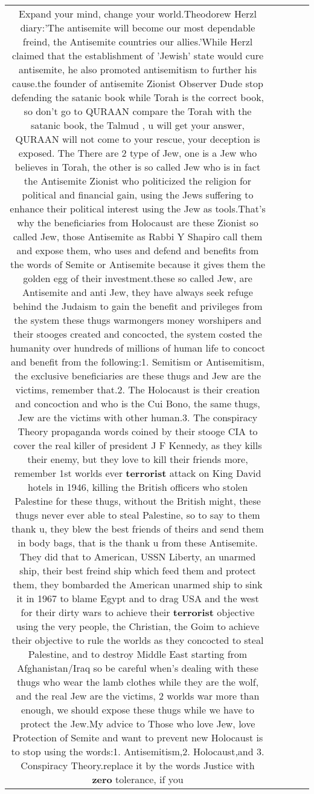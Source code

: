 \documentclass[11pt]{article}
\newlength\mylength
\begin{document}
\begin{center}
\begin{longtable}{|C{.65\mylength}|C{.30\mylength}|C{.12\mylength}|C{.12\mylength}|C{.12\mylength}|}
  \small Expand your mind, change your world.Theodorew Herzl diary:'The antisemite will become our most dependable freind, the Antisemite countries our allies.'While Herzl claimed that the establishment of 'Jewish' state would cure antisemite, he also promoted antisemitism to further his cause.the founder of antisemite Zionist Observer Dude stop defending the satanic book while Torah is the correct book, so don't go to QURAAN compare the Torah with the satanic book, the Talmud , u will get your answer, QURAAN will not come to your rescue, your deception is exposed. The There are 2 type of Jew, one is a Jew who believes in Torah, the other is so called Jew who is in fact the Antisemite Zionist who politicized the religion for political and financial gain, using the Jews suffering to enhance their political interest using the Jew as tools.That's  why the beneficiaries from Holocaust are these Zionist so called Jew, those Antisemite as Rabbi Y Shapiro call them and expose them, who uses and defend and benefits from the words of Semite or Antisemite because it gives them the golden egg of their investment.these  so called Jew, are Antisemite and anti Jew, they have always seek refuge behind the Judaism to gain the benefit and privileges from the system these thugs warmongers money worshipers and their stooges created and concocted, the system costed the humanity over hundreds of millions of human  life to concoct and benefit from the following:1. Semitism or Antisemitism, the exclusive beneficiaries are these thugs and Jew are the victims, remember that.2. The Holocaust is their creation  and concoction and who is the Cui Bono, the same thugs, Jew are the victims with other human.3. The conspiracy Theory propaganda words coined by their stooge CIA to cover the real killer of president J F Kennedy, as they kills their enemy, but they love to kill their friends more, remember 1st worlds ever \textbf{terrorist} attack on King David hotels in 1946, killing the British officers who stolen Palestine for these thugs, without the British might, these thugs never ever able to steal Palestine, so to say to them thank u, they blew the best friends of theirs and send them in body bags, that is the thank u from these Antisemite. They did that to American, USSN Liberty, an unarmed ship,  their best freind ship which feed them and protect them, they bombarded the American unarmed ship to sink it in 1967 to blame Egypt and to drag USA and the west for their dirty wars to achieve their \textbf{terrorist} objective  using the very people, the Christian, the Goim to achieve their objective to rule the worlds as they concocted to steal Palestine, and to destroy Middle East starting from Afghanistan/Iraq so be careful when's dealing with these thugs who wear the lamb clothes while they are the wolf, and the real Jew are the victims, 2 worlds war more than enough, we should expose these thugs while we have to protect the Jew.My advice to Those who love Jew, love Protection of Semite and want to prevent new Holocaust is to stop using the words:1.  Antisemitism,2. Holocaust,and 3. Conspiracy Theory.replace it by the words Justice with \textbf{zero} tolerance, if you 
\end{longtable}
\end{center}
\end{document}
